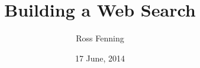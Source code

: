 \documentclass{beamer}
\title{Building a Web Search}
\author{Ross Fenning}
\institute{
  Senior Software Engineer
  \\Content Discovery
  \\Future Media
  \\BBC
}
\date{17 June, 2014}
\begin{document}
\begin{frame}[plain]
  \titlepage
\end{frame}

\end{document}

